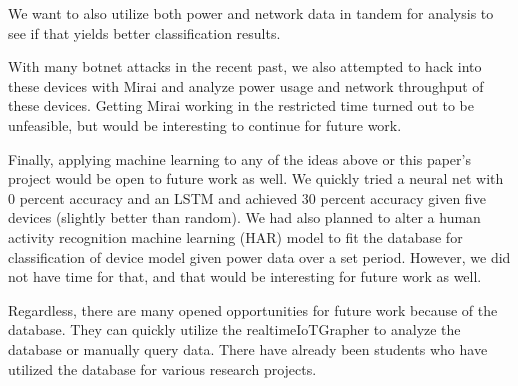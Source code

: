 We want to also utilize both power and network data in tandem for analysis to see if that yields better classification results.

With many botnet attacks in the recent past, we also attempted to hack into these devices with Mirai and analyze power usage and network throughput of these devices. Getting Mirai working in the restricted time turned out to be unfeasible, but would be interesting to continue for future work.

Finally, applying machine learning to any of the ideas above or this paper's project would be open to future work as well. We quickly tried a neural net with 0 percent accuracy and an LSTM and achieved 30 percent accuracy given five devices (slightly better than random). We had also planned to alter a human activity recognition machine learning (HAR)  model to fit the database for classification of device model given power data over a set period. However, we did not have time for that, and that would be interesting for future work as well.

Regardless, there are many opened opportunities for future work because of the database. They can quickly utilize the realtimeIoTGrapher to analyze the database or manually query data. There have already been students who have utilized the database for various research projects.